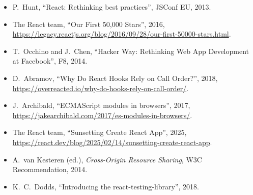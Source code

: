 \begin{itemize}
  \item P.\ Hunt, ``React: Rethinking best practices'', JSConf EU, 2013.
  \item The React team, ``Our First 50,000 Stars'', 2016,
        \url{https://legacy.reactjs.org/blog/2016/09/28/our-first-50000-stars.html}.
  \item T.\ Occhino and J.\ Chen, ``Hacker Way: Rethinking Web App Development
        at Facebook'', F8, 2014.
  \item D.\ Abramov, ``Why Do React Hooks Rely on Call Order?'', 2018,
        \url{https://overreacted.io/why-do-hooks-rely-on-call-order/}.
  \item J.\ Archibald, ``ECMAScript modules in browsers'', 2017,
        \url{https://jakearchibald.com/2017/es-modules-in-browsers/}.
  \item The React team, ``Sunsetting Create React App'', 2025,
        \url{https://react.dev/blog/2025/02/14/sunsetting-create-react-app}.
  \item A.\ van Kesteren (ed.), \emph{Cross-Origin Resource Sharing}, W3C
        Recommendation, 2014.
  \item K.~C.\ Dodds, ``Introducing the react-testing-library'', 2018.
\end{itemize}
